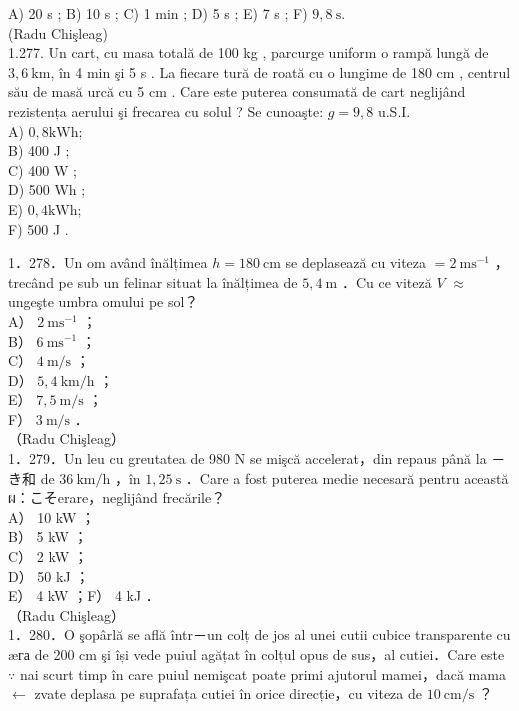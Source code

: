 {A) 20 s ; B) 10 s ; C) 1 min ; D) 5 s ; E) 7 s ; F) $9,8 \mathrm{~s}$.\\
(Radu Chişleag)\\
1.277. Un cart, cu masa totală de 100 kg , parcurge uniform o rampă lungă de $3,6 \mathrm{~km}$, în 4 min şi 5 s . La fiecare tură de roată cu o lungime de 180 cm , centrul său de masă urcă cu 5 cm . Care este puterea consumată de cart neglijând rezistența aerului şi frecarea cu solul ? Se cunoaşte: $g=9,8$ u.S.I.\\
A) $0,8 \mathrm{kWh}$;\\
B) 400 J ;\\
C) 400 W ;\\
D) 500 Wh ;\\
E) $0,4 \mathrm{kWh}$;\\
F) 500 J .

1．278．Un om având înălțimea $h=180 \mathrm{~cm}$ se deplasează cu viteza $=2 \mathrm{~ms}^{-1}$ ，trecând pe sub un felinar situat la înălțimea de $5,4 \mathrm{~m}$ ．Cu ce viteză $V$ $\approx$ ungeşte umbra omului pe sol？\\
A） $2 \mathrm{~ms}^{-1}$ ；\\
B） $6 \mathrm{~ms}^{-1}$ ；\\
C） $4 \mathrm{~m} / \mathrm{s}$ ；\\
D） $5,4 \mathrm{~km} / \mathrm{h}$ ；\\
E） $7,5 \mathrm{~m} / \mathrm{s}$ ；\\
F） $3 \mathrm{~m} / \mathrm{s}$ ．\\
（Radu Chişleag）\\
1．279．Un leu cu greutatea de 980 N se mişcă accelerat，din repaus până la －き和 de $36 \mathrm{~km} / \mathrm{h}$ ，în $1,25 \mathrm{~s}$ ．Care a fost puterea medie necesară pentru această ผ：こそerare，neglijând frecările？\\
A） 10 kW ；\\
B） 5 kW ；\\
C） 2 kW ；\\
D） 50 kJ ；\\
E） 4 kW ；F） 4 kJ ．\\
（Radu Chişleag）\\
1．280．O şopârlă se află într－un colț de jos al unei cutii cubice transparente cu æга de 200 cm şi își vede puiul agățat în colțul opus de sus，al cutiei．Care este $\because$ nai scurt timp în care puiul nemişcat poate primi ajutorul mamei，dacă mama $\leftarrow$ zvate deplasa pe suprafața cutiei în orice direcție，cu viteza de $10 \mathrm{~cm} / \mathrm{s}$ ？

}

